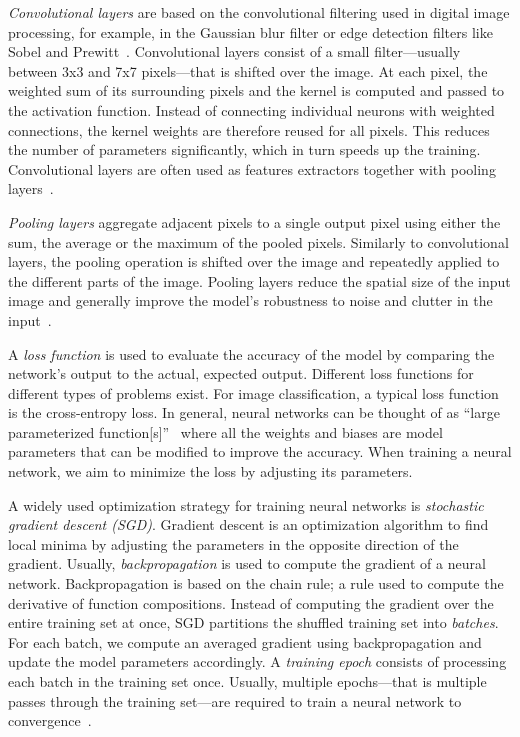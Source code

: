 \documentclass[conference]{IEEEtran}
\begin{document}
\emph{Convolutional layers} are based on the convolutional filtering used in digital image processing, for example, in the Gaussian blur filter or edge detection filters like Sobel and Prewitt~\cite{Stockman:2001:CV:558008}.
Convolutional layers consist of a small filter---usually between 3x3 and 7x7 pixels---that is shifted over the image.
At each pixel, the weighted sum of its surrounding pixels and the kernel is computed and passed to the activation function.
Instead of connecting individual neurons with weighted connections, the kernel weights are therefore reused for all pixels.
This reduces the number of parameters significantly, which in turn speeds up the training.
Convolutional layers are often used as features extractors together with pooling layers~\cite{lecun2010convolutional}.

\emph{Pooling layers} aggregate adjacent pixels to a single output pixel using either the sum, the average or the maximum of the pooled pixels.
Similarly to convolutional layers, the pooling operation is shifted over the image and repeatedly applied to the different parts of the image.
Pooling layers reduce the spatial size of the input image and generally improve the model's robustness to noise and clutter in the input~\cite{lecun2010convolutional,chilimbi2014-Project-Adam}.

A \emph{loss function} is used to evaluate the accuracy of the model by comparing the network's output to the actual, expected output.
Different loss functions for different types of problems exist.
For image classification, a typical loss function is the cross-entropy loss.
%
In general, neural networks can be thought of as ``large parameterized function[s]''~\cite{paine2013-GPU-async-SGD} where all the weights and biases are model parameters that can be modified to improve the accuracy.
When training a neural network, we aim to minimize the loss by adjusting its parameters.

A widely used optimization strategy for training neural networks is \emph{stochastic gradient descent (SGD)}. %
Gradient descent is an optimization algorithm to find local minima by adjusting the parameters in the opposite direction of the gradient.
%
Usually, \emph{backpropagation} is used to compute the gradient of a neural network.
Backpropagation is based on the chain rule; a rule used to compute the derivative of function compositions.
%
Instead of computing the gradient over the entire training set at once, SGD partitions the shuffled training set into \emph{batches}.
For each batch, we compute an averaged gradient using backpropagation and update the model parameters accordingly.
%
A \emph{training epoch} consists of processing each batch in the training set once.
Usually, multiple epochs---that is multiple passes through the training set---are required to train a neural network to convergence~\cite{chilimbi2014-Project-Adam}.
\end{document}
